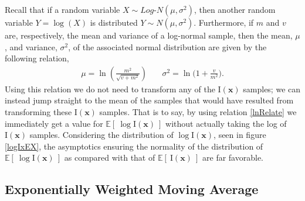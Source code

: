 \documentclass[12pt]{article}
\newcommand{\E}[1]{
        \mathbb{E}\left[~#1~\right]
}
\def \ix {
	\text{I}(\bm{x})
}
\begin{document}
	Recall that if a random variable $X\sim Log$-$N(\mu, \sigma^2)$, then another random variable $Y=\log(X)$ is distributed $Y\sim N(\mu, \sigma^2)$.
	Furthermore, if $m$ and $v$ are, respectively, the mean and variance of a log-normal sample, then the mean, $\mu$, and variance, $\sigma^2$, of the associated normal distribution are given by the following relation,
	\begin{eqnarray}
	\mu = \ln\left( \frac{m^2}{\sqrt{v+m^2}} \right) &~&  \sigma^2 = \ln\bigg( 1+ \frac{v}{m^2} \bigg).
	\label{lnRelate}
	\end{eqnarray}
	Using this relation we do not need to transform any of the $\ix$ samples; we can instead jump straight to the mean of the samples that would have resulted from transforming these $\ix$ samples.
	That is to say, by using relation \ref{lnRelate} we immediately get a value for $\E{\log\ix}$ without actually taking the log of $\ix$ samples.
	Considering the distribution of $\log\ix$, seen in figure \ref{logIxEX}, the asymptotics ensuring the normality of the distribution of $\E{\log\ix}$ as compared with that of $\E{\ix}$ are far favorable. %
	
	\subsection{Exponentially Weighted Moving Average}
	
\end{document}
